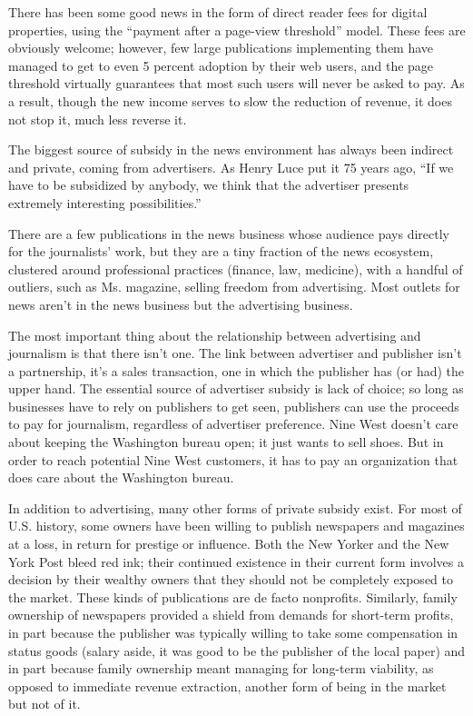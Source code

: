 There has been some good news in the form of direct reader fees for digital
properties, using the ``payment after a page-view threshold'' model. These fees
are obviously welcome; however, few large publications implementing them have
managed to get to even 5 percent adoption by their web users, and the page
threshold virtually guarantees that most such users will never be asked to pay. As
a result, though the new income serves to slow the reduction of revenue, it does
not stop it, much less reverse it.

The biggest source of subsidy in the news environment has always been indirect
and private, coming from advertisers. As Henry Luce put it 75 years ago, ``If we
have to be subsidized by anybody, we think that the advertiser presents extremely
interesting possibilities.''

There are a few publications in the news business whose audience pays directly
for the journalists’ work, but they are a tiny fraction of the news ecosystem,
clustered around professional practices (finance, law, medicine), with a handful of
outliers, such as Ms. magazine, selling freedom from advertising. Most outlets for
news aren’t in the news business but the advertising business.

The most important thing about the relationship between advertising and journalism
is that there isn’t one. The link between advertiser and publisher isn’t a
partnership, it’s a sales transaction, one in which the publisher has (or had) the
upper hand. The essential source of advertiser subsidy is lack of choice; so long as
businesses have to rely on publishers to get seen, publishers can use the proceeds
to pay for journalism, regardless of advertiser preference. Nine West doesn’t care about keeping the Washington bureau open; it just wants to sell shoes. But in order to reach potential Nine West customers, it has to pay an organization that
does care about the Washington bureau.

In addition to advertising, many other forms of private subsidy exist. For most
of U.S. history, some owners have been willing to publish newspapers and magazines
at a loss, in return for prestige or influence. Both the New Yorker and the
New York Post bleed red ink; their continued existence in their current form
involves a decision by their wealthy owners that they should not be completely
exposed to the market. These kinds of publications are de facto nonprofits.
Similarly, family ownership of newspapers provided a shield from demands for
short-term profits, in part because the publisher was typically willing to take
some compensation in status goods (salary aside, it was good to be the publisher
of the local paper) and in part because family ownership meant managing for
long-term viability, as opposed to immediate revenue extraction, another form
of being in the market but not of it.

